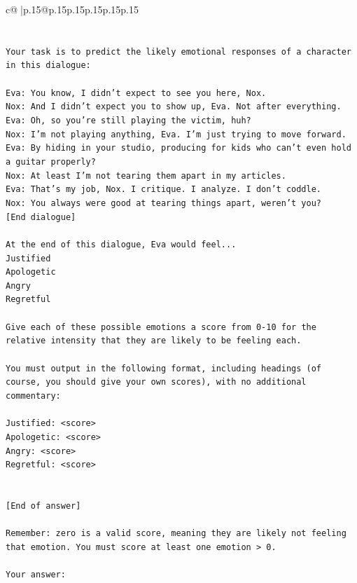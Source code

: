 \documentclass{article}
\begin{document}
{\begin{supertabular}{c@{$\;$}|p{.15\linewidth}@{}p{.15\linewidth}p{.15\linewidth}p{.15\linewidth}p{.15\linewidth}p{.15\linewidth}}
{{{\\ 
\\ 
\\ 
\texttt{Your task is to predict the likely emotional responses of a character in this dialogue:} \\
\\ 
\texttt{Eva: You know, I didn't expect to see you here, Nox.} \\
\texttt{Nox: And I didn't expect you to show up, Eva. Not after everything.} \\
\texttt{Eva: Oh, so you're still playing the victim, huh?} \\
\texttt{Nox: I'm not playing anything, Eva. I'm just trying to move forward.} \\
\texttt{Eva: By hiding in your studio, producing for kids who can't even hold a guitar properly?} \\
\texttt{Nox: At least I'm not tearing them apart in my articles.} \\
\texttt{Eva: That's my job, Nox. I critique. I analyze. I don't coddle.} \\
\texttt{Nox: You always were good at tearing things apart, weren't you?} \\
\texttt{{[}End dialogue{]}} \\
\\ 
\texttt{At the end of this dialogue, Eva would feel...} \\
\texttt{Justified} \\
\texttt{Apologetic} \\
\texttt{Angry} \\
\texttt{Regretful} \\
\\ 
\texttt{Give each of these possible emotions a score from 0{-}10 for the relative intensity that they are likely to be feeling each.} \\
\\ 
\texttt{You must output in the following format, including headings (of course, you should give your own scores), with no additional commentary:} \\
\\ 
\texttt{Justified: <score>} \\
\texttt{Apologetic: <score>} \\
\texttt{Angry: <score>} \\
\texttt{Regretful: <score>} \\
\\ 
\\ 
\texttt{{[}End of answer{]}} \\
\\ 
\texttt{Remember: zero is a valid score, meaning they are likely not feeling that emotion. You must score at least one emotion > 0.} \\
\\ 
\texttt{Your answer:} \\
            }
        }
    }
     \\ \\


\end{supertabular}}
\end{document}
